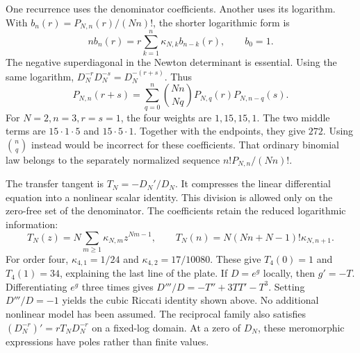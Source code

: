 One recurrence uses the denominator coefficients. Another uses its logarithm. With $b_n(r)=P_{N,n}(r)/(Nn)!$, the shorter logarithmic form is
\[
nb_n(r)=r\sum_{k=1}^{n}\kappa_{N,k}b_{n-k}(r),\qquad b_0=1.
\]
The negative superdiagonal in the Newton determinant is essential.
Using the same logarithm, $D_N^{-r}D_N^{-s}=D_N^{-(r+s)}$. Thus
\[
P_{N,n}(r+s)=\sum_{q=0}^{n}\binom{Nn}{Nq}P_{N,q}(r)P_{N,n-q}(s).
\]
For $N=2,n=3,r=s=1$, the four weights are $1,15,15,1$. The two middle terms are $15\cdot1\cdot5$ and $15\cdot5\cdot1$. Together with the endpoints, they give $272$.
Using $\binom nq$ instead would be incorrect for these coefficients. That ordinary binomial law belongs to the separately normalized sequence $n!P_{N,n}/(Nn)!$.

The transfer tangent is $T_N=-D_N'/D_N$. It compresses the linear differential equation into a nonlinear scalar identity. This division is allowed only on the zero-free set of the denominator.
The coefficients retain the reduced logarithmic information:
\[
T_N(z)=N\sum_{m\ge1}\kappa_{N,m}z^{Nm-1},
\qquad T_N(n)=N(Nn+N-1)!\kappa_{N,n+1}.
\]
For order four, $\kappa_{4,1}=1/24$ and $\kappa_{4,2}=17/10080$. These give $T_4(0)=1$ and $T_4(1)=34$, explaining the last line of the plate.
If $D=e^g$ locally, then $g'=-T$. Differentiating $e^g$ three times gives $D'''/D=-T''+3TT'-T^3$. Setting $D'''/D=-1$ yields the cubic Riccati identity shown above. No additional nonlinear model has been assumed.
The reciprocal family also satisfies $(D_N^{-r})'=rT_ND_N^{-r}$ on a fixed-log domain. At a zero of $D_N$, these meromorphic expressions have poles rather than finite values.


